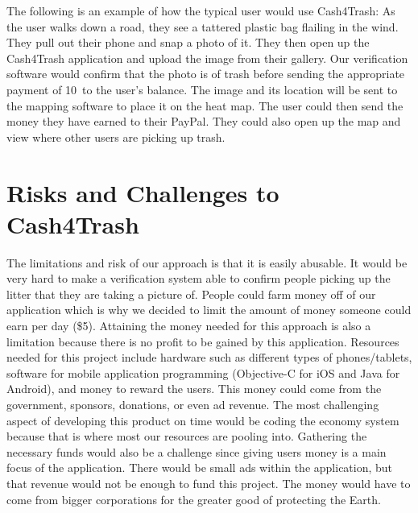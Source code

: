 \documentclass[letterpaper,12pt,titlepage]{article}
\begin{document}
\newpage
The following is an example of how the typical user would use Cash4Trash:
As the user walks down a road, they see a tattered plastic bag flailing in the wind. They pull out their phone and snap a photo of it. They then open up the Cash4Trash application and upload the image from their gallery. Our verification software would confirm that the photo is of trash before sending the appropriate payment of 10\cent\ to the user's balance. The image and its location will be sent to the mapping software to place it on the heat map. The user could then send the money they have earned to their PayPal. They could also open up the map and view where other users are picking up trash.
\newline
\newline

\section{Risks and Challenges to Cash4Trash}
The limitations and risk of our approach is that it is easily abusable. It would be very hard to make a verification system able to confirm people picking up the litter that they are taking a picture of. People could farm money off of our application which is why we decided to limit the amount of money someone could earn per day (\$5). Attaining the money needed for this approach is also a limitation because there is no profit to be gained by this application.
\newline
\newline
Resources needed for this project include hardware such as different types of phones/tablets, software for mobile application programming (Objective-C for iOS and Java for Android), and money to reward the users. This money could come from the government, sponsors, donations, or even ad revenue.
\newline
\newline
The most challenging aspect of developing this product on time would be coding the economy system because that is where most our resources are pooling into. Gathering the necessary funds would also be a challenge since giving users money is a main focus of the application. There would be small ads within the application, but that revenue would not be enough to fund this project. The money would have to come from bigger corporations for the greater good of protecting the Earth.
\newpage



\end{document}
